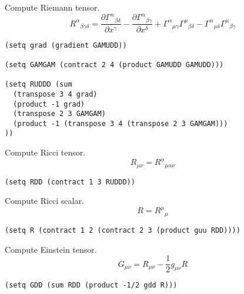 \documentclass[12pt]{article}
\begin{document}
Compute Riemann tensor.
%
\begin{equation*}
R^\alpha{}_{\beta\gamma\delta}
=\frac{\partial\Gamma^\alpha{}_{\beta\delta}}{\partial x^\gamma}
-\frac{\partial\Gamma^\alpha{}_{\beta\gamma}}{\partial x^\delta}
+\Gamma^\alpha{}_{\mu\gamma}\Gamma^\mu{}_{\beta\delta}
-\Gamma^\alpha{}_{\mu\delta}\Gamma^\mu{}_{\beta\gamma}
\end{equation*}
%
\begin{verbatim}
(setq grad (gradient GAMUDD))

(setq GAMGAM (contract 2 4 (product GAMUDD GAMUDD)))

(setq RUDDD (sum
  (transpose 3 4 grad)
  (product -1 grad)
  (transpose 2 3 GAMGAM)
  (product -1 (transpose 3 4 (transpose 2 3 GAMGAM)))
))
\end{verbatim}

Compute Ricci tensor.
\begin{equation*}
R_{\mu\nu}=R^\alpha{}_{\mu\alpha\nu}
\end{equation*}
%
\begin{verbatim}
(setq RDD (contract 1 3 RUDDD))
\end{verbatim}

Compute Ricci scalar.
\begin{equation*}
R=R^\mu{}_\mu
\end{equation*}
%
\begin{verbatim}
(setq R (contract 1 2 (contract 2 3 (product guu RDD))))
\end{verbatim}

Compute Einstein tensor.
\begin{equation*}
G_{\mu\nu}=R_{\mu\nu}-\frac{1}{2}g_{\mu\nu}R
\end{equation*}
%
\begin{verbatim}
(setq GDD (sum RDD (product -1/2 gdd R)))
\end{verbatim}
\end{document}
